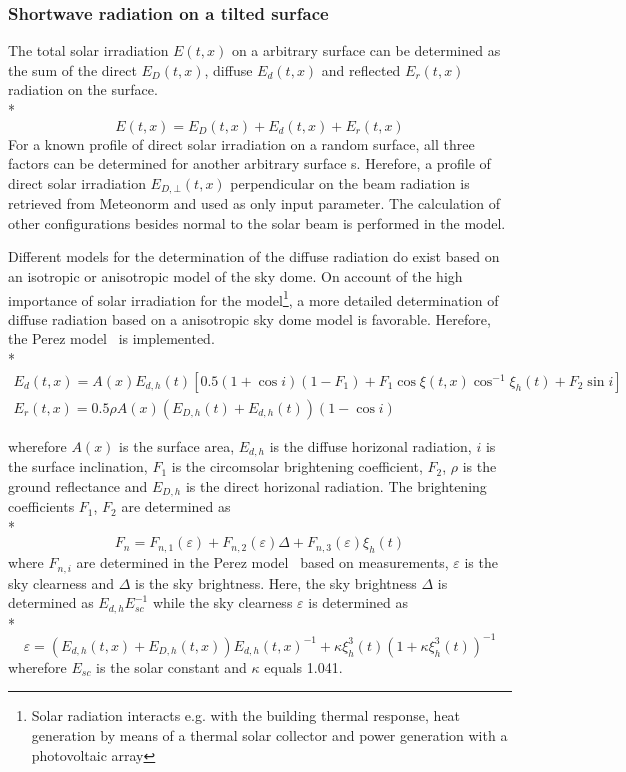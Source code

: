 \subsubsection{Shortwave radiation on a tilted surface}

The total solar irradiation $E(t,x)$ on a arbitrary surface can be determined as the sum of the direct $E_{D}(t,x)$, diffuse $E_{d}(t,x)$ and reflected $E_{r}(t,x)$ radiation on the surface.  \\*
\begin{equation}
E(t,x)=E_{D}(t,x)+E_{d}(t,x)+E_{r}(t,x)
\end{equation}
For a known profile of direct solar irradiation on a random surface, all three factors can be determined for another arbitrary surface s. Herefore, a profile of direct solar irradiation $E_{D,\bot}(t,x)$ perpendicular on the beam radiation is retrieved from Meteonorm and used as only input parameter. The calculation of other configurations besides normal to the solar beam is performed in the model. 

Different models for the determination of the diffuse radiation do exist based on an isotropic or anisotropic model of the sky dome. On account of the high importance of solar irradiation for the model\footnote{Solar radiation interacts e.g. with the building thermal response, heat generation by means of a thermal solar collector and power generation with a photovoltaic array}, a more detailed determination of diffuse radiation based on a anisotropic sky dome model is favorable. Herefore, the Perez model~\cite{Perez1986,Perez1987} is implemented.  \\*
\begin{gather}
E_{d}(t,x) =  A(x) E_{d,h}(t) \left[ 0.5 \left(1+\cos i\right) \left(1-F_{1}\right) + F_{1} \cos\xi(t,x) \cos^{-1}\xi_{h}(t) + F_{2} \sin i\right]  \\
E_{r}(t,x) = 0.5 \rho A(x) \left(E_{D,h}(t) + E_{d,h}(t)\right) \left(1 - \cos i\right)
\end{gather}

wherefore $A(x)$ is the surface area, $E_{d,h}$ is the diffuse horizonal radiation, $i$ is the surface inclination, $F_{1}$ is the circomsolar brightening coefficient, $F_{2}$, $\rho$ is the ground reflectance and $E_{D,h}$ is the direct horizonal radiation. The brightening coefficients $F_{1}$, $F_{2}$ are determined as \\*
\begin{equation}
F_{n} = F_{n,1}(\varepsilon) + F_{n,2}(\varepsilon) \Delta + F_{n,3}(\varepsilon) \xi_{h}(t)
\end{equation}
where $F_{n,i}$ are determined in the Perez model~\cite{Perez1987} based on measurements, $\varepsilon$ is the sky clearness and $\Delta$ is the sky brightness. Here, the sky brightness $\Delta$ is determined as $E_{d,h} E_{sc}^{-1}$ while the sky clearness $\varepsilon$ is determined as \\*
\begin{equation}
\varepsilon = \left(E_{d,h}(t,x) + E_{D,h}(t,x)\right) E_{d,h}(t,x)^{-1} + \kappa \xi_{h}^{3}(t) \left(1 + \kappa \xi_{h}^{3}(t)\right)^{-1}
\end{equation}
wherefore $E_{sc}$ is the solar constant and $\kappa$ equals 1.041.

